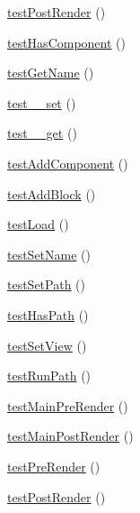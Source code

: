 \begin{DoxyCompactItemize}
\hyperlink{class_controller_test_ac6ebb6172efb2ecd0b15f9744e6ef9bf}{testPostRender} ()
\item 
\hyperlink{class_controller_test_acb53320008ca581179db23556700d4e5}{testHasComponent} ()
\item 
\hyperlink{class_controller_test_acba9d09ebb47d7bcc46128a07f694ccd}{testGetName} ()
\item 
\hyperlink{class_controller_test_a7b300f4c5f11473da6817fc40dddfb65}{test\_\-\_\-set} ()
\item 
\hyperlink{class_controller_test_a0bd71464eaa6e9559e3f4d78d70f224f}{test\_\-\_\-get} ()
\item 
\hyperlink{class_controller_test_a50544a9c31e0a302438a1d93152d16df}{testAddComponent} ()
\item 
\hyperlink{class_controller_test_a199ef516140a2c7749869a86941ffd4d}{testAddBlock} ()
\item 
\hyperlink{class_controller_test_a9772b11dffd28551c31884820d2ca5a0}{testLoad} ()
\item 
\hyperlink{class_controller_test_aa266c56714debf7411043e50816febfb}{testSetName} ()
\item 
\hyperlink{class_controller_test_aee9eb7cc15a6702779af7c6dcd6f37f7}{testSetPath} ()
\item 
\hyperlink{class_controller_test_ad342a101d96328075917c8ded4d109a4}{testHasPath} ()
\item 
\hyperlink{class_controller_test_acc332363200dfd6b2f0cd9df5a567788}{testSetView} ()
\item 
\hyperlink{class_controller_test_af74af347aef8c236c3f30793e881a56c}{testRunPath} ()
\item 
\hyperlink{class_controller_test_adebbb5338f993c808bf7d67d691cf1a9}{testMainPreRender} ()
\item 
\hyperlink{class_controller_test_a92fe7f1df3870f770d2a4d8e65994755}{testMainPostRender} ()
\item 
\hyperlink{class_controller_test_ac6794ab53872a13d8d18dcac6d64c46e}{testPreRender} ()
\item 
\hyperlink{class_controller_test_ac6ebb6172efb2ecd0b15f9744e6ef9bf}{testPostRender} ()
\end{DoxyCompactItemize}
